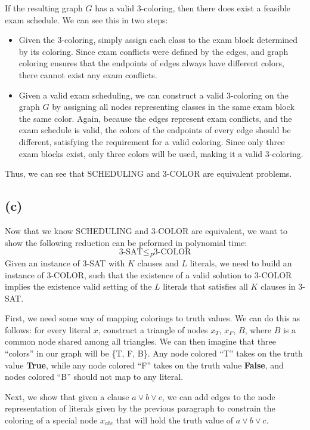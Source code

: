 \documentclass{6046}
\begin{document}
If the resulting graph $G$ has a valid 3-coloring, then
there does exist a feasible exam schedule. We can see
this in two steps:
\begin{itemize}
    \item Given the 3-coloring, simply assign each class
    to the exam block determined by its coloring. Since
    exam conflicts were defined by the edges, and
    graph coloring ensures that the endpoints of
    edges always have different colors, there cannot
    exist any exam conflicts.
    \item Given a valid exam scheduling, we can
    construct a valid 3-coloring on the graph $G$
    by assigning all nodes representing classes
    in the same exam block the same color. Again,
    because the edges represent exam conflicts,
    and the exam schedule is valid, the colors
    of the endpoints of every edge should be different,
    satisfying the requirement for a valid coloring. Since
    only three exam blocks exist, only three colors will
    be used, making it a valid 3-coloring.
\end{itemize}

Thus, we can see that SCHEDULING and 3-COLOR are equivalent
problems.

\subsection*{(c)}
Now that we know SCHEDULING and 3-COLOR are equivalent,
we want to show the following reduction can be peformed
in polynomial time:
\[
    \text{3-SAT} \le_P \text{3-COLOR}
\]
Given an instance of 3-SAT with $K$ clauses 
and $L$ literals, we need to build an instance of 3-COLOR,
such that the existence of a valid solution to
3-COLOR implies the existence valid setting
of the $L$ literals that satisfies all $K$ clauses
in 3-SAT.

First, we need some way of mapping colorings to truth values.
We can do this as follows: for every literal $x$,
construct a triangle of nodes $x_T$, $x_F$, $B$, where
$B$ is a common node shared among all triangles. We can
then imagine that three ``colors'' in our graph will be
\{T, F, B\}. Any node colored ``T'' takes on the truth
value {\bf True}, while any node colored ``F'' takes
on the truth value {\bf False}, and nodes colored ``B''
should not map to any literal.

Next, we show that given a clause $a \vee b \vee c$,
we can add edges to the node representation of literals
given by the previous paragraph to constrain
the coloring of a special node $x_{abc}$ that will
hold the truth value of $a \vee b \vee c$.
\end{document}
